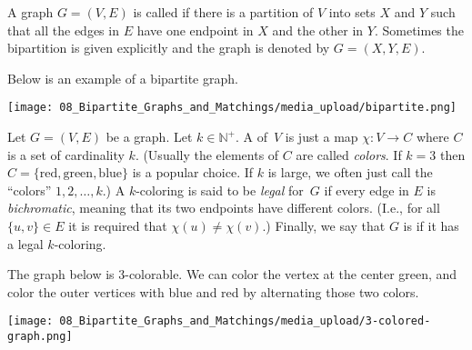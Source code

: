 \begin{flex}
\begin{definition} \label{definition:Bipartite-graph}
A graph $G = (V,E)$ is called  if there is a partition of $V$ into sets $X$ and $Y$ such that all the edges in $E$ have one endpoint in $X$ and the other in $Y$. Sometimes the bipartition is given explicitly and the graph is denoted by $G = (X, Y, E)$. 
\end{definition}

\begin{example} \label{example:Bipartite-graph-example}
Below is an example of a bipartite graph.
\begin{center}
    \texttt{[image: 08\_Bipartite\_Graphs\_and\_Matchings/media\_upload/bipartite.png]}
\end{center}
\end{example}
\end{flex}


\begin{flex}
\begin{definition} \label{definition:k-colorable-graphs}
Let $G = (V,E)$ be a graph.  Let $k \in \mathbb{N}^+$. A  of~$V$ is just a map $\chi : V \to C$ where $C$ is a set of cardinality $k$.  (Usually the elements of $C$ are called \emph{colors}.  If $k = 3$ then $C = \{\text{red},\text{green},\text{blue}\}$ is a popular choice. If $k$ is large, we often just call the ``colors'' $1,2, \dots, k$.)  A $k$-coloring is said to be \emph{legal} for~$G$ if every edge in $E$ is \emph{bichromatic}, meaning that its two endpoints have different colors.  (I.e., for all $\{u,v\} \in E$ it is required that $\chi(u)\neq\chi(v)$.)  Finally, we say that $G$ is  if it has a legal $k$-coloring.
\end{definition}

\begin{example} \label{example:A-3-colorable-graph}
The graph below is 3-colorable. We can color the vertex at the center green, and color the outer vertices with blue and red by alternating those two colors.
\begin{center}
    \texttt{[image: 08\_Bipartite\_Graphs\_and\_Matchings/media\_upload/3-colored-graph.png]}
\end{center}
\end{example}
\end{flex}


